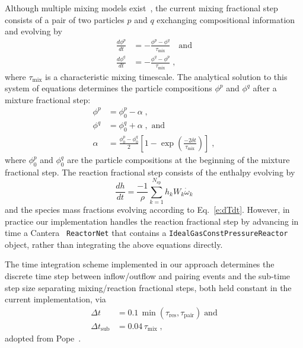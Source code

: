 \documentclass[preprint,12pt]{elsarticle}
\newcommand{ \numsp }{N_{\text{sp}}}
\begin{document}
{Although multiple mixing models exist~\cite{Ren:2004fz}, the current mixing fractional step consists of a pair of two particles $p$ and $q$ exchanging compositional information and evolving by
\begin{align}
\frac{d \phi^p}{dt} &= - \frac{ \phi^p - \phi^q }{ \tau_{\text{mix}} } \quad \text{and} \\
\frac{d \phi^q}{dt} &= - \frac{ \phi^q - \phi^p }{ \tau_{\text{mix}} } \;,
\end{align}
where $\tau_{\text{mix}}$ is a characteristic mixing timescale.
The analytical solution to this system of equations determines the particle compositions $\phi^p$ and $\phi^q$ after a mixture fractional step:
\begin{align}
\phi^p &= \phi^p_0 - \alpha \;, \\
\phi^q &= \phi^q_0 + \alpha \;, \text{ and} \\
\alpha &= \frac{ \phi^p_0 - \phi^q_0 }{2} \left[1 - \exp \left( \frac{-2 \delta t}{\tau_{\text{mix}}} \right) \right] \;,
\end{align}
where $\phi^p_0$ and $\phi^q_0$ are the particle compositions at the beginning of the mixture fractional step.
The reaction fractional step consists of the enthalpy evolving by
\begin{equation}
\frac{dh}{dt} = \frac{-1}{\rho} \sum_{k=1}^{\numsp} h_k W_k \dot{\omega}_k
\end{equation}
and the species mass fractions evolving according to Eq.~\eqref{e:dTdt}.
However, in practice our implementation handles the reaction fractional step by advancing in time a Cantera~\cite{Goodwin:2015aa} \texttt{ReactorNet} that contains a \texttt{IdealGasConstPressureReactor} object, rather than integrating the above equations directly.

The time integration scheme implemented in our approach determines the discrete time step between inflow\slash outflow and pairing events and the sub-time step size separating mixing\slash reaction fractional steps, both held constant in the current implementation, via
\begin{align}
\Delta t &= 0.1 \, \min \left( \tau_{\text{res}} , \tau_{\text{pair}} \right) \; \text{and} \\
\Delta t_{\text{sub}} &= 0.04 \, \tau_{\text{mix}} \;,
\end{align}
adopted from Pope~\cite{Pope:1997wu}.

}
\end{document}
